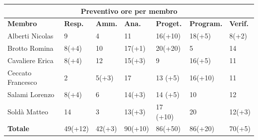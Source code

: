 \documentclass[a4paper, 12pt]{article}
\begin{document}
\begin{center}
	\begin{tabularx}{\textwidth}{|X|X|X|X|X|X|X|}
		\hline
		\multicolumn{7}{|c|}{\textbf{Preventivo ore per membro}}                                            \\
		\hline
		\hline
		\textbf{Membro}   & \textbf{Resp.}    & \textbf{Amm.}   & \textbf{Ana.} &
		\textbf{Proget.}  & \textbf{Program.} & \textbf{Verif.}                                             \\
		\hline
		Alberti Nicolas   & 9                 & 4               & 11            & 16(+10)  		& 18(+5) 	 & 8(+2)      \\
		\hline
		Brotto Romina     & 8(+4)                & 10              & 17(+1)        & 20(+20)      & 5       & 14 \\
		\hline
		Cavaliere Erica   & 8(+4)                & 12             & 15(+3)         & 9 		 & 16(+5) 	 & 11     \\
		\hline
		Ceccato Francesco & 2                & 5(+3)            & 17            & 13 (+5) 		& 16(+10)  	& 11     \\
		\hline
		Salami Lorenzo    & 8(+4)                & 6               & 14(+3)      & 14 (+5)		 & 10      & 12 \\
		\hline
		Soldà Matteo      & 14                & 3           & 13(+3)            & 17 (+10)    	 & 20 	& 12(+3)  \\
		\hline
		\hline
		\textbf{Totale}   & 49(+12)            & 42(+3)          & 90(+10)        & 86(+50)  & 86(+20) & 70(+5) \\
		\hline
	\end{tabularx}\\[8pt]
	\mbox{}\\
\end{center}

\newpage
\end{document}
